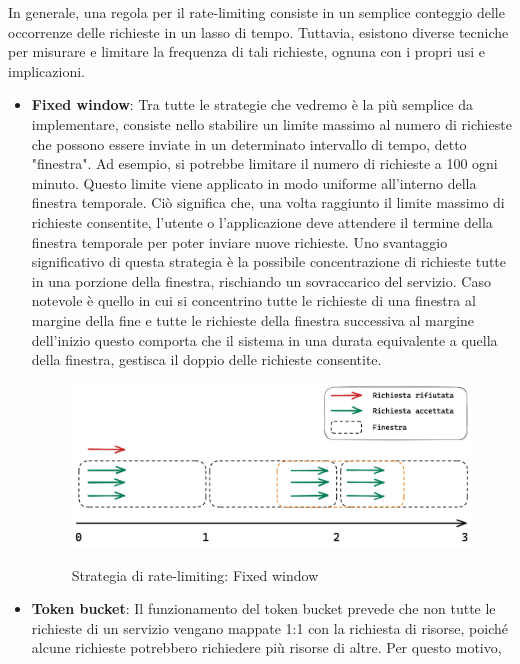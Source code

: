 In generale, una regola per il rate-limiting consiste in un semplice conteggio delle occorrenze delle richieste in un
lasso di tempo. Tuttavia, esistono diverse tecniche per misurare e limitare la frequenza di tali richieste, ognuna con i
propri usi e implicazioni.
\begin{itemize}
    \item \textbf{Fixed window}: Tra tutte le strategie che vedremo è la più semplice da implementare, consiste nello stabilire un
    limite massimo al numero di richieste che possono essere inviate in un determinato intervallo di tempo, detto
    "finestra". Ad esempio, si potrebbe limitare il numero di richieste a 100 ogni minuto. Questo limite viene applicato in
    modo uniforme all'interno della finestra temporale. Ciò significa che, una volta raggiunto il limite massimo di
    richieste consentite, l'utente o l'applicazione deve attendere il termine della finestra temporale per poter inviare
    nuove richieste. Uno svantaggio significativo di questa strategia è la possibile concentrazione di richieste tutte in
    una porzione della finestra, rischiando un sovraccarico del servizio. Caso notevole è quello in cui si concentrino tutte
    le richieste di una finestra al margine della fine e tutte le richieste della finestra successiva al margine dell’inizio
    questo comporta che il sistema in una durata equivalente a quella della finestra, gestisca il doppio delle richieste
    consentite.
    \begin{figure}[H]
        \centering
        \includegraphics[width=13cm]{./chapters/1.state-of-art/images/1.fixed_window.png}
        \label{fig:fixed-window}
        \captionsetup{justification=centering}
        \caption{Strategia di rate-limiting: Fixed window}
    \end{figure}
    \item \textbf{Token bucket}: Il funzionamento del token bucket prevede che non tutte le richieste di un servizio vengano mappate
    1:1 con la richiesta di risorse, poiché alcune richieste potrebbero richiedere più risorse di altre. Per questo motivo,

\end{itemize}
